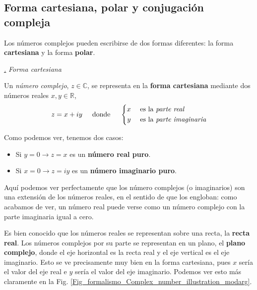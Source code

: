 \documentclass[a4paper,11pt]{book} %
\numberwithin{equation}{chapter}
\def\lch{\left\{}
\def\subsubiContadorIt{\par\addtocounter{subsubsection}{1}\underline{\it\thesubsubsection.}\hskip0.5cm \setcounter{subsubsubsectionIt}{0}}
\newcommand{\SubsubiIt}[1]{
		\subsubiContadorIt \textit{#1}
	}
\newcounter{subsubsubsectionIt}[subsubsection]
\begin{document}
		\subsection{Forma cartesiana, polar y conjugación compleja}

Los números complejos pueden escribirse de dos formas diferentes: la forma \textbf{cartesiana} y la forma \textbf{polar}.

	
			\SubsubiIt{Forma cartesiana}

\begin{mybox_gray2}{}
Un \textit{número complejo}, $z \in \mathbb{C}$, se representa en la \textbf{forma cartesiana} mediante dos números reales $x,y \in \mathbb{R}$,
	\begin{equation}
	z = x + iy \hspace{0.5cm} \text{donde} \hspace{0.5cm} 
	\lch 
	\begin{split}
	x & \quad \text{ es la \textit{parte real}} \\
	y & \quad \text{ es la \textit{parte imaginaria}} \\
	\end{split}
	\right.
	\end{equation}
\end{mybox_gray2}



Como podemos ver, tenemos dos casos:
\begin{itemize}
	\item Si $y=0 \rightarrow z = x$ es un \textbf{número real puro}. 
	\item Si $x = 0 \rightarrow z = iy$ es un \textbf{número imaginario puro}.
\end{itemize}
Aquí podemos ver perfectamente que los número complejos (o imaginarios) son una extensión de los números reales, en el sentido de que los engloban: como acabamos de ver, un número real puede verse como un número complejo con la parte imaginaria igual a cero.


Es bien conocido que los números reales se representan sobre una recta, la \textbf{recta real}. Los números complejos por su parte se representan en un plano, el \textbf{plano complejo}, donde el eje horizontal es la recta real y el eje vertical es el eje imaginario. Esto se ve precisamente muy bien en la forma cartesiana, pues $x$ sería el valor del eje real e $y$ sería el valor del eje imaginario. Podemos ver esto más claramente en la Fig. \ref{Fig_formalismo_Complex_number_illustration_modarg}. 
\end{document}
